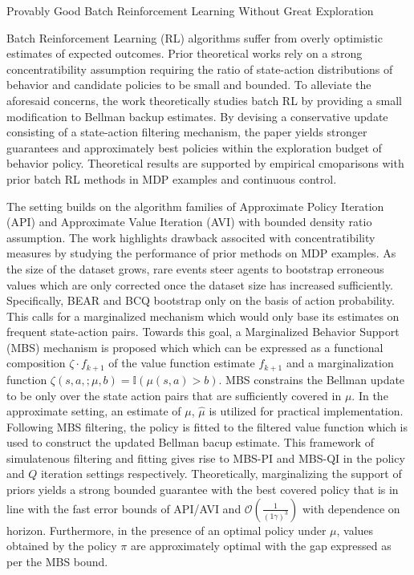 \documentclass[11pt,letterpaper]{article}
\begin{document}
\begin{center}
  \large{Provably Good Batch Reinforcement Learning Without Great Exploration}
\end{center}

Batch Reinforcement Learning (RL) algorithms suffer from overly optimistic estimates of expected outcomes. Prior theoretical works rely on a strong concentratibility assumption requiring the ratio of state-action distributions of behavior and candidate policies to be small and bounded. To alleviate the aforesaid concerns, the work theoretically studies batch RL by providing a small modification to Bellman backup estimates. By devising a conservative update consisting of a state-action filtering mechanism, the paper yields stronger guarantees and approximately best policies within the exploration budget of behavior policy. Theoretical results are supported by empirical cmoparisons with prior batch RL methods in MDP examples and continuous control.

The setting builds on the algorithm families of Approximate Policy Iteration (API) and Approximate Value Iteration (AVI) with bounded density ratio assumption. The work highlights drawback associted with concentratibility measures by studying the performance of prior methods on MDP examples. As the size of the dataset grows, rare events steer agents to bootstrap erroneous values which are only corrected once the dataset size has increased sufficiently. Specifically, BEAR and BCQ bootstrap only on the basis of action probability. This calls for a marginalized mechanism which would only base its estimates on frequent state-action pairs. Towards this goal, a Marginalized Behavior Support (MBS) mechanism is proposed which which can be expressed as a functional composition $\zeta \cdot f_{k+1}$ of the value function estimate $f_{k+1}$ and a marginalization function $\zeta(s,a,;\mu,b) = \mathbb{I}(\mu(s,a)>b)$. MBS constrains the Bellman update to be only over the state action pairs that are sufficiently covered in $\mu$. In the approximate setting, an estimate of $\mu$, $\hat{\mu}$ is utilized for practical implementation. Following MBS filtering, the policy is fitted to the filtered value function which is used to construct the updated Bellman bacup estimate. This framework of simulatenous filtering and fitting gives rise to MBS-PI and MBS-QI in the policy and $Q$ iteration settings respectively. Theoretically, marginalizing the support of priors yields a strong bounded guarantee with the best covered policy that is in line with the fast error bounds of API/AVI and $\mathcal{O}(\frac{1}{(1\gamma)^{3}})$ with dependence on horizon. Furthermore, in the presence of an optimal policy under $\mu$, values obtained by the policy $\pi$ are approximately optimal with the gap expressed as per the MBS bound. 
\end{document}

